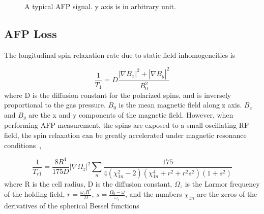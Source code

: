 \begin{figure}[H]\label{AFPSignal}
	\centering
	\caption{{ A typical AFP signal. y axis is in arbitrary unit.}}
	\label{AFPSignal}
\end{figure}

\subsection{AFP Loss}

The longitudinal spin relaxation rate due to static field inhomogeneities is~\cite{PhysRev.138.A946, PhysRev.139.A1398, PhysRevA.37.2877}

\begin{equation}
\frac{1}{T_{1}} = D\frac{|\nabla B_{x}|^{2}+|\nabla B_{y}|^{2}}{B_{0}^{2}}
\end{equation}
where D is the diffusion constant for the polarized spins, and is inversely proportional to the gas pressure. $B_{0}$ is the mean magnetic field along z axis. $B_{x}$ and $B_{y}$ are the x and y components of the magnetic field. However, when performing AFP measurement, the spins are exposed to a small oscillating RF field, the spin relaxation can be greatly accelerated under magnetic resonance conditions~\cite{PhysRevA.38.5092},

\begin{equation}
\frac{1}{T_{r1}} = \frac{8R^{4}}{175D}|\nabla \Omega_{z}|^{2}\sum_{n} \frac{175}{4(\chi_{1n}^{2}-2)(\chi_{1n}^{4}+r^{2}+r^{2}s^{2})(1+s^{2})}
\end{equation}
where R is the cell radius, D is the diffusion constant, $\Omega_{z}$ is the Larmor frequency of the holding field, $r=\frac{\omega_{r}R^{2}}{D}$, $s=\frac{\Omega_{0}-\omega}{\omega_{r}}$, and the numbers $\chi_{1n}$ are the zeros of the derivatives of the spherical Bessel functions

